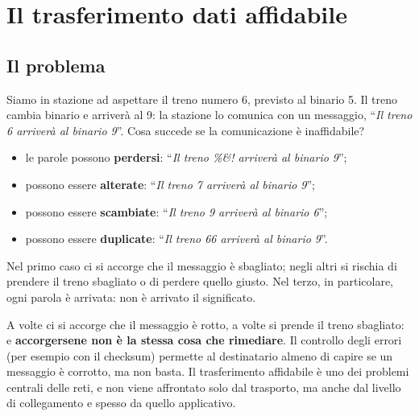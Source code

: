\chapter{Il trasferimento dati affidabile}

\section{Il problema}

Siamo in stazione ad aspettare il treno numero 6, previsto al binario 5. Il treno cambia binario e
arriverà al 9: la stazione lo comunica con un messaggio, ``\emph{Il treno 6 arriverà al binario 9}''.
Cosa succede se la comunicazione è inaffidabile?

\begin{itemize}
    \item le parole possono \textbf{perdersi}: ``\emph{Il treno \%\&! arriverà al binario 9}'';
    \item possono essere \textbf{alterate}: ``\emph{Il treno 7 arriverà al binario 9}'';
    \item possono essere \textbf{scambiate}: ``\emph{Il treno 9 arriverà al binario 6}'';
    \item possono essere \textbf{duplicate}: ``\emph{Il treno 66 arriverà al binario 9}''.
\end{itemize}

Nel primo caso ci si accorge che il messaggio è sbagliato; negli altri si rischia di prendere il treno
sbagliato o di perdere quello giusto. Nel terzo, in particolare, ogni parola è arrivata: non è arrivato il significato.

A volte ci si accorge che il messaggio è rotto, a volte si prende il treno sbagliato: e \textbf{accorgersene non è
la stessa cosa che rimediare}. Il controllo degli errori (per esempio con il checksum) permette al destinatario almeno di
capire se un messaggio è corrotto, ma non basta. Il trasferimento affidabile è uno dei problemi centrali delle reti, e
non viene affrontato solo dal trasporto, ma anche dal livello di collegamento e spesso da quello applicativo.


